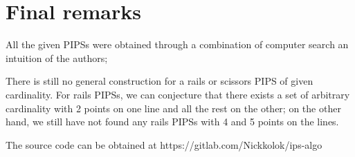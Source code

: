 \documentclass[12pt]{article}
\theoremstyle{theorem}
\theoremstyle{dfn}
\theoremstyle{remark}
\begin{document}
\section{Final remarks}
All the given PIPSs were obtained through a combination of computer search an intuition of the authors;

There is still no general construction for a rails or scissors PIPS of given cardinality.
For rails PIPSs, we can conjecture that there exists a set of arbitrary cardinality with 2 points on one line
and all the rest on the other;
on the other hand, we still have not found any rails PIPSs with 4 and 5 points on the lines.


The source code can be obtained at https://gitlab.com/Nickkolok/ips-algo

\printbibliography
%
\end{document}
